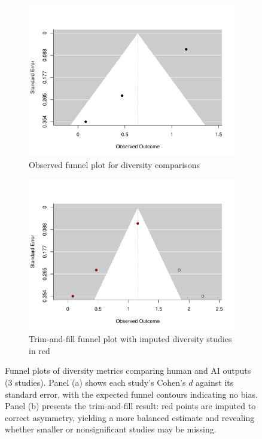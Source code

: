 \documentclass[acmsmall,authorversion]{acmart}
\begin{document}
\begin{figure}[H]
  \centering
  \begin{subfigure}[b]{0.49\linewidth}
    \centering
    \includegraphics[width=\linewidth]{plot_diversity_funnel_observed}
    \caption{Observed funnel plot for diversity comparisons}
  \end{subfigure}%
  \begin{subfigure}[b]{0.49\linewidth}
    \centering
    \includegraphics[width=\linewidth]{plot_diversity_funnel_trimfill}
    \caption{Trim-and-fill funnel plot with imputed diversity studies in red}
  \end{subfigure}
  \caption{Funnel plots of diversity metrics comparing human and AI outputs (3 studies). Panel (a) shows each study’s Cohen’s $d$ against its standard error, with the expected funnel contours indicating no bias. Panel (b) presents the trim-and-fill result: red points are imputed to correct asymmetry, yielding a more balanced estimate and revealing whether smaller or nonsignificant studies may be missing.}
  \label{fig:diversity_funnels}
\end{figure}
\end{document}
